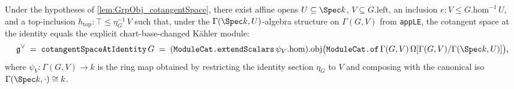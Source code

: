 \begin{lemma}
  \label{lem:GrpObj_cotangentSpace_extendScalars_witness}
  
  Under the hypotheses of \cref{lem:GrpObj_cotangentSpace}, there exist affine opens \(U \subseteq \Spec k\), \(V \subseteq G.\mathrm{left}\), an inclusion \(e \colon V \leq G.\mathrm{hom}^{-1}\,U\), and a top-inclusion \(h_{\mathrm{top}} \colon \top \leq \eta_{G}^{-1}\,V\) such that, under the \(\Gamma(\Spec k, U)\)-algebra structure on \(\Gamma(G, V)\) from \texttt{appLE}, the cotangent space at the identity equals the explicit chart-base-changed Kähler module:
  \[
    \mathfrak g^{\vee} \;=\; \texttt{cotangentSpaceAtIdentity}\,G \;=\; (\texttt{ModuleCat.extendScalars}\,\psi_{V}.\mathrm{hom}).\mathrm{obj}\bigl(\texttt{ModuleCat.of}\,\Gamma(G, V)\,\Omega[\Gamma(G, V)/\Gamma(\Spec k, U)]\bigr),
  \]
  where \(\psi_{V} \colon \Gamma(G, V) \to k\) is the ring map obtained by restricting the identity section \(\eta_{G}\) to \(V\) and composing with the canonical iso \(\Gamma(\Spec k, \cdot) \cong k\).
\end{lemma}

